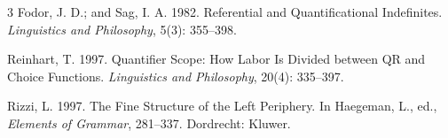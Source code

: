 \documentclass[letterpaper]{article}
\begin{document}
\begin{thebibliography}{3}
Fodor, J. D.; and Sag, I. A. 1982. Referential and Quantificational Indefinites. \emph{Linguistics and Philosophy}, 5(3): 355--398.

Reinhart, T. 1997. Quantifier Scope: How Labor Is Divided between QR and Choice Functions. \emph{Linguistics and Philosophy}, 20(4): 335--397.

Rizzi, L. 1997. The Fine Structure of the Left Periphery. In Haegeman, L., ed., \emph{Elements of Grammar}, 281--337. Dordrecht: Kluwer.
\end{thebibliography}
\end{document}
